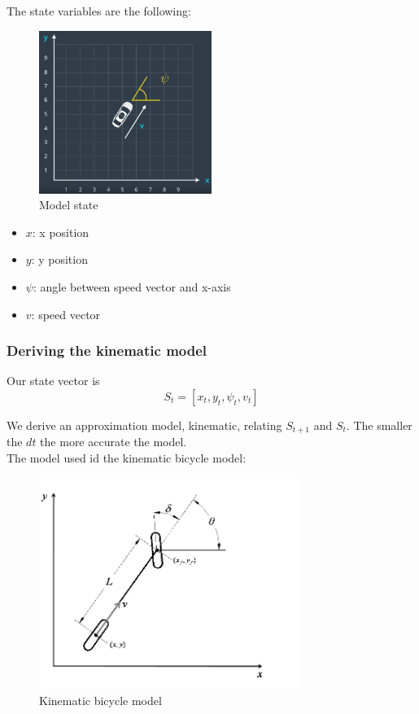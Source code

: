 \documentclass[11pt]{article}
\begin{document}
The state variables are the following:

\begin{figure}[h]
    \centering
    \includegraphics[width=0.5\textwidth]{state}
    \caption{Model state}
    \label{fig:state}
\end{figure}
\FloatBarrier

\begin{itemize}
\item $x$: x position
\item $y$: y position
\item $\psi$: angle between speed vector and x-axis
\item $v$: speed vector
\end{itemize}

\subsubsection{Deriving the kinematic model}


Our state vector is $$ S_t = [x_t, y_t, \psi_t, v_t] $$

We derive an approximation model, kinematic, relating $S_{t+1}$ and $S_t$. The smaller the $dt$ the more accurate the model. \\

The model used id the kinematic bicycle model:

\begin{figure}[h]
    \centering
    \includegraphics[width=0.75\textwidth]{bicycle_model}
    \caption{Kinematic bicycle model}
    \label{fig:bicycle_model}
\end{figure}
\FloatBarrier
\end{document}
